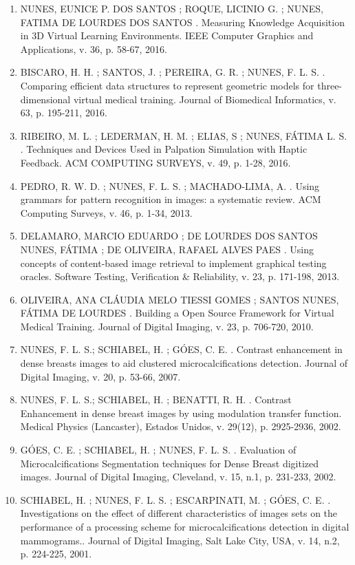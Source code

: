 \documentclass[11pt,a4paper,sans]{moderncv} %
\begin{document}
\begin{enumerate}
    \item NUNES, EUNICE P. DOS SANTOS ; ROQUE, LICINIO G. ; NUNES, FATIMA DE LOURDES DOS SANTOS . Measuring Knowledge Acquisition in 3D Virtual Learning Environments. IEEE Computer Graphics and Applications, v. 36, p. 58-67, 2016.
    \item BISCARO, H. H. ; SANTOS, J. ; PEREIRA, G. R. ; NUNES, F. L. S. . Comparing efficient data structures to represent geometric models for three-dimensional virtual medical training. Journal of Biomedical Informatics, v. 63, p. 195-211, 2016.
    \item RIBEIRO, M. L. ; LEDERMAN, H. M. ; ELIAS, S ; NUNES, FÁTIMA L. S. . Techniques and Devices Used in Palpation Simulation with Haptic Feedback. ACM COMPUTING SURVEYS, v. 49, p. 1-28, 2016.
    \item PEDRO, R. W. D. ; NUNES, F. L. S. ; MACHADO-LIMA, A. . Using grammars for pattern recognition in images: a systematic review. ACM Computing Surveys, v. 46, p. 1-34, 2013.
    \item DELAMARO, MARCIO EDUARDO ; DE LOURDES DOS SANTOS NUNES, FÁTIMA ; DE OLIVEIRA, RAFAEL ALVES PAES . Using concepts of content-based image retrieval to implement graphical testing oracles. Software Testing, Verification \& Reliability, v. 23, p. 171-198, 2013.
    \item OLIVEIRA, ANA CLÁUDIA MELO TIESSI GOMES ; SANTOS NUNES, FÁTIMA DE LOURDES . Building a Open Source Framework for Virtual Medical Training. Journal of Digital Imaging, v. 23, p. 706-720, 2010.
    \item NUNES, F. L. S.; SCHIABEL, H. ; GÓES, C. E. . Contrast enhancement in dense breasts images to aid clustered microcalcifications detection. Journal of Digital Imaging, v. 20, p. 53-66, 2007.
    \item NUNES, F. L. S.; SCHIABEL, H. ; BENATTI, R. H. . Contrast Enhancement in dense breast images by using modulation transfer function. Medical Physics (Lancaster), Estados Unidos, v. 29(12), p. 2925-2936, 2002.
    \item GÓES, C. E. ; SCHIABEL, H. ; NUNES, F. L. S. . Evaluation of Microcalcifications Segmentation techniques for Dense Breast digitized images. Journal of Digital Imaging, Cleveland, v. 15, n.1, p. 231-233, 2002.
    \item SCHIABEL, H. ; NUNES, F. L. S. ; ESCARPINATI, M. ; GÓES, C. E. . Investigations on the effect of different characteristics of images sets on the performance of a processing scheme for microcalcifications detection in digital mammograms.. Journal of Digital Imaging, Salt Lake City, USA, v. 14, n.2, p. 224-225, 2001.

\end{enumerate}
\end{document}
